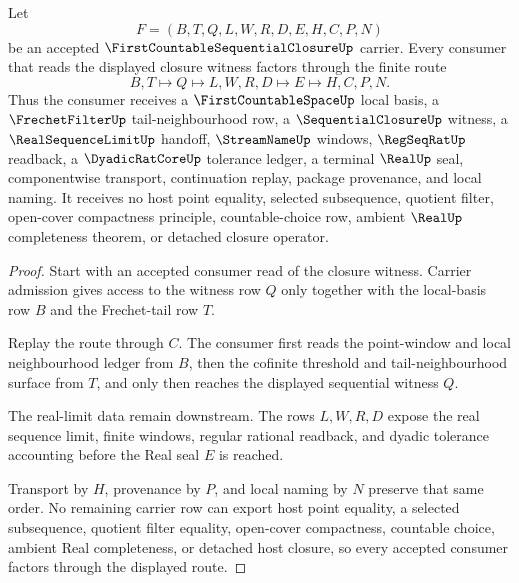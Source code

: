 \begin{theorem}
\label{thm:first-countable-sequential-closure-route}
Let
$$
F=(B,T,Q,L,W,R,D,E,H,C,P,N)
$$
be an accepted $\FirstCountableSequentialClosureUp$ carrier. Every consumer that reads the displayed closure witness factors through the finite route
$$
B,T \longmapsto Q \longmapsto L,W,R,D \longmapsto E \longmapsto H,C,P,N .
$$
Thus the consumer receives a $\FirstCountableSpaceUp$ local basis, a $\FrechetFilterUp$ tail-neighbourhood row, a $\SequentialClosureUp$ witness, a $\RealSequenceLimitUp$ handoff, $\StreamNameUp$ windows, $\RegSeqRatUp$ readback, a $\DyadicRatCoreUp$ tolerance ledger, a terminal $\RealUp$ seal, componentwise transport, continuation replay, package provenance, and local naming. It receives no host point equality, selected subsequence, quotient filter, open-cover compactness principle, countable-choice row, ambient $\RealUp$ completeness theorem, or detached closure operator.
\end{theorem}
\begin{proof}
Start with an accepted consumer read of the closure witness. Carrier admission gives access to the witness row $Q$ only together with the local-basis row $B$ and the Frechet-tail row $T$.

Replay the route through $C$. The consumer first reads the point-window and local neighbourhood ledger from $B$, then the cofinite threshold and tail-neighbourhood surface from $T$, and only then reaches the displayed sequential witness $Q$.

The real-limit data remain downstream. The rows $L,W,R,D$ expose the real sequence limit, finite windows, regular rational readback, and dyadic tolerance accounting before the Real seal $E$ is reached.

Transport by $H$, provenance by $P$, and local naming by $N$ preserve that same order. No remaining carrier row can export host point equality, a selected subsequence, quotient filter equality, open-cover compactness, countable choice, ambient Real completeness, or detached host closure, so every accepted consumer factors through the displayed route.
\end{proof}


